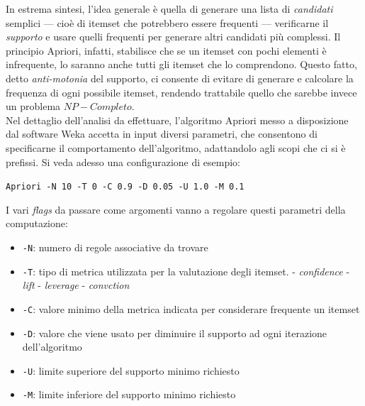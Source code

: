         In estrema sintesi, l'idea generale è quella di generare una lista di \textit{candidati} semplici --- cioè di itemset che potrebbero essere frequenti --- verificarne il \textit{supporto} e usare quelli frequenti per generare altri candidati più complessi. Il principio Apriori, infatti, stabilisce che se un itemset con pochi elementi è infrequente, lo saranno anche tutti gli itemset che lo comprendono. Questo fatto, detto \textit{anti-motonia} del supporto, ci consente di evitare di generare e calcolare la frequenza di ogni possibile itemset, rendendo trattabile quello che sarebbe invece un problema $NP-Completo$. \\

        Nel dettaglio dell'analisi da effettuare, l'algoritmo Apriori messo a disposizione dal software Weka accetta in input diversi parametri, che consentono di specificarne il comportamento dell'algoritmo, adattandolo agli scopi che ci si è prefissi. Si veda adesso una configurazione di esempio:\\

        \begin{center}
            \noindent \texttt{Apriori -N 10 -T 0 -C 0.9 -D 0.05 -U 1.0 -M 0.1}
        \end{center}

        I vari \textit{flags} da passare come argomenti vanno a regolare questi parametri della computazione:

        \begin{itemize}
            \item \texttt{-N}: numero di regole associative da trovare
            \item \texttt{-T}: tipo di metrica utilizzata per la valutazione degli itemset.
                 - \textit{confidence}
                 - \textit{lift}
                 - \textit{leverage}
                 - \textit{convction}
            \item \texttt{-C}: valore minimo della metrica indicata per considerare frequente un itemset
            \item \texttt{-D}: valore che viene usato per diminuire il supporto ad ogni iterazione dell'algoritmo
            \item \texttt{-U}: limite superiore del supporto minimo richiesto
            \item \texttt{-M}: limite inferiore del supporto minimo richiesto 
        \end{itemize}

